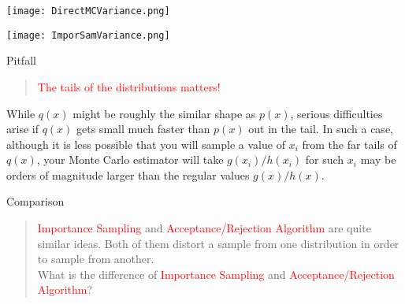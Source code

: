 \begin{frame}
\texttt{[image: DirectMCVariance.png]}\\
\end{frame}


\begin{frame}
\texttt{[image: ImporSamVariance.png]}\\
\end{frame}

\begin{frame}{Pitfall}
\begin{quote}
\textcolor{red}{The tails of the distributions matters!}\\
\end{quote}
While $q(x)$ might be roughly the similar shape as $p(x)$, serious difficulties arise if $q(x)$ gets small much faster than $p(x)$ out in the tail. In such a case, although it is less possible that you will sample a value of $x_{i}$ from the far tails of $q(x)$, your Monte Carlo estimator will take $g\left(x_{i}\right) / h\left(x_{i}\right)$ for such $x_{i}$ may be orders of magnitude larger than the regular values $g\left(x\right) / h\left(x\right)$.
\end{frame}

\begin{frame}{Comparison}
\begin{quote}
\textcolor{red}{Importance Sampling} and \textcolor{red}{Acceptance/Rejection Algorithm} are quite similar ideas. Both of them distort a sample from one distribution in order to sample from another. \\
What is the difference of \textcolor{red}{Importance Sampling} and \textcolor{red}{Acceptance/Rejection Algorithm}?\\
\end{quote}
\end{frame}

